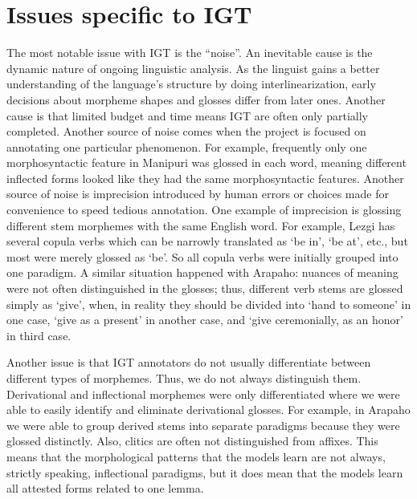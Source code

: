 \section{Issues specific to IGT}
\label{sec:issues}

The most notable issue with IGT is the ``noise''. An inevitable cause is the dynamic nature of ongoing linguistic analysis. As the linguist gains a better understanding of the language's structure by doing interlinearization, early decisions about morpheme shapes and glosses differ from later ones. Another cause is that limited budget and time means IGT are often only partially completed. Another source of noise comes when the project is focused on annotating one particular phenomenon. For example, frequently only one morphosyntactic feature in Manipuri was glossed in each word, meaning different inflected forms looked like they had the same morphosyntactic features. Another source of noise is imprecision introduced by human errors or choices made for convenience to speed tedious annotation. One example of imprecision is glossing different stem morphemes with the same English word. For example, Lezgi has several copula verbs which can be narrowly translated as `be in', `be at', etc., but most were merely glossed as `be'. So all copula verbs were initially grouped into one paradigm. A similar situation happened with Arapaho: nuances of meaning were not often distinguished in the glosses; thus, different verb stems are glossed simply as ‘give’, when, in reality they should be divided into ‘hand to someone’ in one case, ‘give as a present’ in another case, and ‘give ceremonially, as an honor’ in third case.

Another issue is that IGT annotators do not usually differentiate between different types of morphemes. Thus, we do not always distinguish them. Derivational and inflectional morphemes were only differentiated where we were able to easily identify and eliminate derivational glosses. For example, in Arapaho we were able to group derived stems into separate paradigms because they were glossed distinctly. Also, clitics are often not distinguished from affixes. This means that the morphological patterns that the models learn are not always, strictly speaking, inflectional paradigms, but it does mean that the models learn all attested forms related to one lemma.


